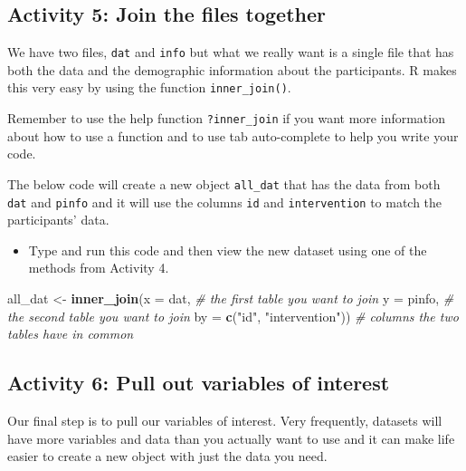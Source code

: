 \documentclass[]{book}
\newenvironment{Shaded}{\begin{snugshade}}{\end{snugshade}}
\newcommand{\CommentTok}[1]{\textcolor[rgb]{0.56,0.35,0.01}{\textit{#1}}}
\newcommand{\DataTypeTok}[1]{\textcolor[rgb]{0.13,0.29,0.53}{#1}}
\newcommand{\KeywordTok}[1]{\textcolor[rgb]{0.13,0.29,0.53}{\textbf{#1}}}
\newcommand{\NormalTok}[1]{#1}
\newcommand{\StringTok}[1]{\textcolor[rgb]{0.31,0.60,0.02}{#1}}
\providecommand{\tightlist}{%
  \setlength{\itemsep}{0pt}\setlength{\parskip}{0pt}}
\begin{document}
\hypertarget{join}{%
\subsection{Activity 5: Join the files together}\label{join}}

We have two files, \texttt{dat} and \texttt{info} but what we really want is a single file that has both the data and the demographic information about the participants. R makes this very easy by using the function \texttt{inner\_join()}.

Remember to use the help function \texttt{?inner\_join} if you want more information about how to use a function and to use tab auto-complete to help you write your code.

The below code will create a new object \texttt{all\_dat} that has the data from both \texttt{dat} and \texttt{pinfo} and it will use the columns \texttt{id} and \texttt{intervention} to match the participants' data.

\begin{itemize}
\tightlist
\item
  Type and run this code and then view the new dataset using one of the methods from Activity 4.
\end{itemize}

\begin{Shaded}
\begin{Highlighting}[]
\NormalTok{all_dat <-}\StringTok{ }\KeywordTok{inner_join}\NormalTok{(}\DataTypeTok{x =}\NormalTok{ dat, }\CommentTok{# the first table you want to join}
                      \DataTypeTok{y =}\NormalTok{ pinfo, }\CommentTok{# the second table you want to join}
                      \DataTypeTok{by =} \KeywordTok{c}\NormalTok{(}\StringTok{"id"}\NormalTok{, }\StringTok{"intervention"}\NormalTok{)) }\CommentTok{# columns the two tables have in common}
\end{Highlighting}
\end{Shaded}

\hypertarget{ref1}{%
\subsection{Activity 6: Pull out variables of interest}\label{ref1}}

Our final step is to pull our variables of interest. Very frequently, datasets will have more variables and data than you actually want to use and it can make life easier to create a new object with just the data you need.
\end{document}
